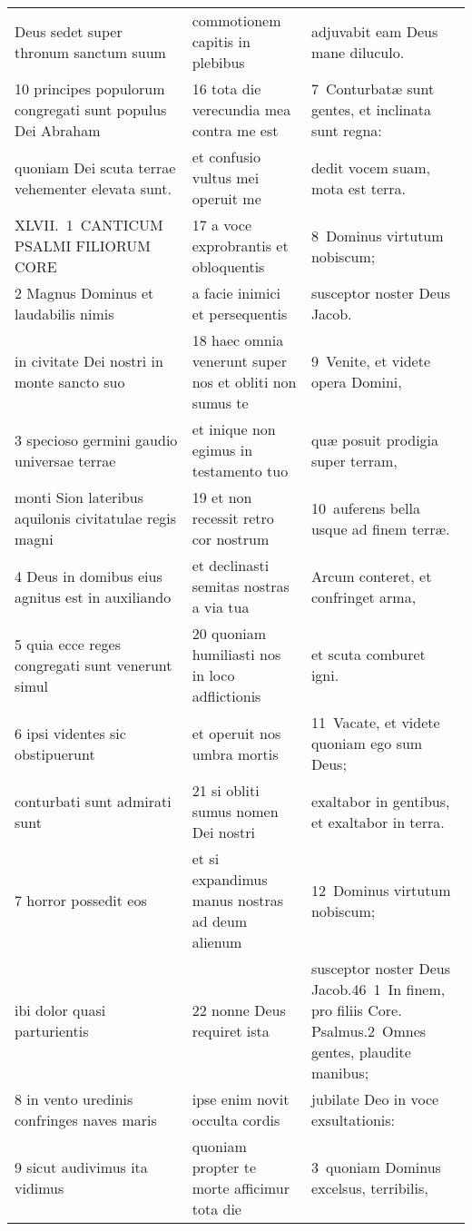 \documentclass{article}
\begin{document}
\begin{longtable}{@{}p{}p{}p{}@{}}
Deus sedet super thronum sanctum suum	&	commotionem capitis in plebibus	&	adjuvabit eam Deus mane diluculo.	\\
10 principes populorum congregati sunt populus Dei Abraham	&	16 tota die verecundia mea contra me est	&	7 Conturbatæ sunt gentes, et inclinata sunt regna:	\\
quoniam Dei scuta terrae vehementer elevata sunt.	&	et confusio vultus mei operuit me	&	dedit vocem suam, mota est terra.	\\
XLVII. 1 CANTICUM PSALMI FILIORUM CORE	&	17 a voce exprobrantis et obloquentis	&	8 Dominus virtutum nobiscum;	\\
2 Magnus Dominus et laudabilis nimis	&	a facie inimici et persequentis	&	susceptor noster Deus Jacob.	\\
in civitate Dei nostri in monte sancto suo	&	18 haec omnia venerunt super nos et obliti non sumus te	&	9 Venite, et videte opera Domini,	\\
3 specioso germini gaudio universae terrae	&	et inique non egimus in testamento tuo	&	quæ posuit prodigia super terram,	\\
monti Sion lateribus aquilonis civitatulae regis magni	&	19 et non recessit retro cor nostrum	&	10 auferens bella usque ad finem terræ.	\\
4 Deus in domibus eius agnitus est in auxiliando	&	et declinasti semitas nostras a via tua	&	Arcum conteret, et confringet arma,	\\
5 quia ecce reges congregati sunt venerunt simul	&	20 quoniam humiliasti nos in loco adflictionis	&	et scuta comburet igni.	\\
6 ipsi videntes sic obstipuerunt	&	et operuit nos umbra mortis	&	11 Vacate, et videte quoniam ego sum Deus;	\\
conturbati sunt admirati sunt	&	21 si obliti sumus nomen Dei nostri	&	exaltabor in gentibus, et exaltabor in terra.	\\
7 horror possedit eos	&	et si expandimus manus nostras ad deum alienum	&	12 Dominus virtutum nobiscum;	\\
ibi dolor quasi parturientis	&	22 nonne Deus requiret ista	&	susceptor noster Deus Jacob.46 1 In finem, pro filiis Core. Psalmus.2 Omnes gentes, plaudite manibus;	\\
8 in vento uredinis confringes naves maris	&	ipse enim novit occulta cordis	&	jubilate Deo in voce exsultationis:	\\
9 sicut audivimus ita vidimus	&	quoniam propter te morte afficimur tota die	&	3 quoniam Dominus excelsus, terribilis,	\\

\end{longtable}
\end{document}
